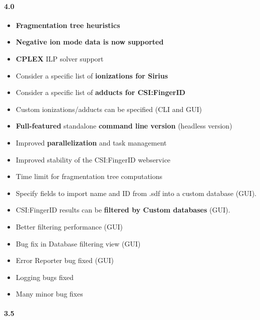 \paragraph{4.0}
\begin{itemize}
\item
   \textbf{Fragmentation tree heuristics}
\item
   \textbf{Negative ion mode data is now supported}
\item
   \textbf{CPLEX} ILP solver support
\item
   Consider a specific list of \textbf{ionizations for Sirius}
\item
   Consider a specific list of \textbf{adducts for CSI:FingerID}
\item
   Custom ionizations/adducts can be specified (CLI and GUI)
\item
  \textbf{Full-featured} standalone \textbf{command line version} (headless version)
\item
  Improved \textbf{parallelization} and task management
\item
  Improved stability of the CSI:FingerID webservice
\item
  Time limit for fragmentation tree computations
\item
  Specify fields to import name and ID from .sdf into a custom database (GUI).
\item
  CSI:FingerID results can be \textbf{filtered by Custom databases} (GUI).
\item
  Better filtering performance (GUI)
\item
  Bug fix in Database filtering view (GUI)
\item
  Error Reporter bug fixed (GUI)
\item
  Logging bugs fixed
\item
  Many minor bug fixes
\end{itemize}


\paragraph{3.5}

